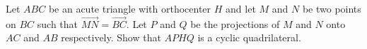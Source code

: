 Let $ABC$ be an acute triangle with orthocenter $H$ and let $M$ and $N$ be two points
on $BC$ such that $\overrightarrow{MN} = \overrightarrow{BC}$. Let $P$ and $Q$ be the
projections of $M$ and $N$ onto $AC$ and $AB$ respectively.
Show that $APHQ$ is a cyclic quadrilateral.